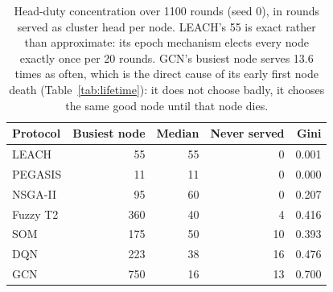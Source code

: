 \begin{table}[!t]
\caption{Head-duty concentration over 1100 rounds (seed 0), in rounds served as cluster head per node. LEACH's 55 is exact rather than approximate: its epoch mechanism elects every node exactly once per 20 rounds. GCN's busiest node serves 13.6 times as often, which is the direct cause of its early first node death (Table~\ref{tab:lifetime}): it does not choose badly, it chooses the same good node until that node dies.}
\label{tab:head-rotation}
\centering
\begin{tabular}{lrrrr}
\toprule
Protocol & Busiest node & Median & Never served & Gini \\
\midrule
LEACH & 55 & 55 & 0 & 0.001 \\
PEGASIS & 11 & 11 & 0 & 0.000 \\
NSGA-II & 95 & 60 & 0 & 0.207 \\
Fuzzy T2 & 360 & 40 & 4 & 0.416 \\
SOM & 175 & 50 & 10 & 0.393 \\
DQN & 223 & 38 & 16 & 0.476 \\
GCN & 750 & 16 & 13 & 0.700 \\
\bottomrule
\end{tabular}
\end{table}
